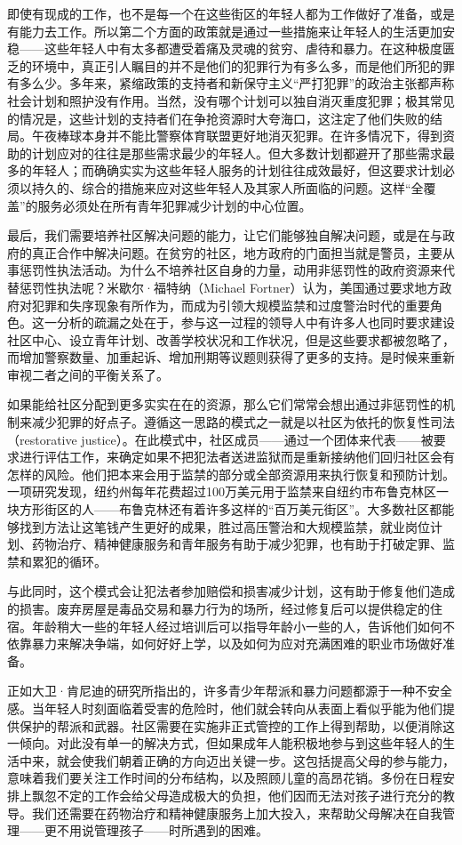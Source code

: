 \documentclass[fontset=fandol, a4paper, 12pt, openright]{ctexbook}
\begin{document}
即使有现成的工作，也不是每一个在这些街区的年轻人都为工作做好了准备，或是有能力去工作。所以第二个方面的政策就是通过一些措施来让年轻人的生活更加安稳——这些年轻人中有太多都遭受着痛及灵魂的贫穷、虐待和暴力。在这种极度匮乏的环境中，真正引人瞩目的并不是他们的犯罪行为有多么多，而是他们所犯的罪有多么少。多年来，紧缩政策的支持者和新保守主义“严打犯罪”的政治主张都声称社会计划和照护没有作用。当然，没有哪个计划可以独自消灭重度犯罪；极其常见的情况是，这些计划的支持者们在争抢资源时大夸海口，这注定了他们失败的结局。午夜棒球本身并不能比警察体育联盟更好地消灭犯罪。在许多情况下，得到资助的计划应对的往往是那些需求最少的年轻人。但大多数计划都避开了那些需求最多的年轻人；而确确实实为这些年轻人服务的计划往往成效最好，但这要求计划必须以持久的、综合的措施来应对这些年轻人及其家人所面临的问题。这样“全覆盖”的服务必须处在所有青年犯罪减少计划的中心位置。

最后，我们需要培养社区解决问题的能力，让它们能够独自解决问题，或是在与政府的真正合作中解决问题。在贫穷的社区，地方政府的门面担当就是警员，主要从事惩罚性执法活动。为什么不培养社区自身的力量，动用非惩罚性的政府资源来代替惩罚性执法呢？米歇尔·福特纳（Michael Fortner）认为，美国通过要求地方政府对犯罪和失序现象有所作为，而成为引领大规模监禁和过度警治时代的重要角色。这一分析的疏漏之处在于，参与这一过程的领导人中有许多人也同时要求建设社区中心、设立青年计划、改善学校状况和工作状况，但是这些要求都被忽略了，而增加警察数量、加重起诉、增加刑期等议题则获得了更多的支持。是时候来重新审视二者之间的平衡关系了。

如果能给社区分配到更多实实在在的资源，那么它们常常会想出通过非惩罚性的机制来减少犯罪的好点子。遵循这一思路的模式之一就是以社区为依托的恢复性司法（restorative justice）。在此模式中，社区成员——通过一个团体来代表——被要求进行评估工作，来确定如果不把犯法者送进监狱而是重新接纳他们回归社区会有怎样的风险。他们把本来会用于监禁的部分或全部资源用来执行恢复和预防计划。一项研究发现，纽约州每年花费超过100万美元用于监禁来自纽约市布鲁克林区一块方形街区的人——布鲁克林还有着许多这样的“百万美元街区”。大多数社区都能够找到方法让这笔钱产生更好的成果，胜过高压警治和大规模监禁，就业岗位计划、药物治疗、精神健康服务和青年服务有助于减少犯罪，也有助于打破定罪、监禁和累犯的循环。

与此同时，这个模式会让犯法者参加赔偿和损害减少计划，这有助于修复他们造成的损害。废弃房屋是毒品交易和暴力行为的场所，经过修复后可以提供稳定的住宿。年龄稍大一些的年轻人经过培训后可以指导年龄小一些的人，告诉他们如何不依靠暴力来解决争端，如何好好上学，以及如何为应对充满困难的职业市场做好准备。

正如大卫·肯尼迪的研究所指出的，许多青少年帮派和暴力问题都源于一种不安全感。当年轻人时刻面临着受害的危险时，他们就会转向从表面上看似乎能为他们提供保护的帮派和武器。社区需要在实施非正式管控的工作上得到帮助，以便消除这一倾向。对此没有单一的解决方式，但如果成年人能积极地参与到这些年轻人的生活中来，就会使我们朝着正确的方向迈出关键一步。这包括提高父母的参与能力，意味着我们要关注工作时间的分布结构，以及照顾儿童的高昂花销。多份在日程安排上飘忽不定的工作会给父母造成极大的负担，他们因而无法对孩子进行充分的教导。我们还需要在药物治疗和精神健康服务上加大投入，来帮助父母解决在自我管理——更不用说管理孩子——时所遇到的困难。
\end{document}
